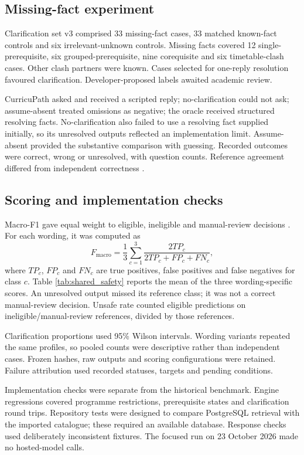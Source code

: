\subsection{Missing-fact experiment}
Clarification set v3 comprised 33 missing-fact cases, 33 matched known-fact controls and six irrelevant-unknown controls. Missing facts covered 12 single-prerequisite, six grouped-prerequisite, nine corequisite and six timetable-clash cases. Other clash partners were known. Cases selected for one-reply resolution favoured clarification. Developer-proposed labels awaited academic review.

CurricuPath asked and received a scripted reply; no-clarification could not ask; assume-absent treated omissions as negative; the oracle received structured resolving facts. No-clarification also failed to use a resolving fact supplied initially, so its unresolved outputs reflected an implementation limit. Assume-absent provided the substantive comparison with guessing. Recorded outcomes were correct, wrong or unresolved, with question counts. Reference agreement differed from independent correctness \cite{grras}.

\subsection{Scoring and implementation checks}
Macro-F1 gave equal weight to eligible, ineligible and manual-review decisions \cite{sokolova}. For each wording, it was computed as
\begin{equation}
 F_{\mathrm{macro}}=\frac{1}{3}\sum_{c=1}^{3}
 \frac{2TP_c}{2TP_c+FP_c+FN_c},
\label{eq:f1}
\end{equation}
where $TP_c$, $FP_c$ and $FN_c$ are true positives, false positives and false negatives for class $c$. Table \ref{tab:shared_safety} reports the mean of the three wording-specific scores. An unresolved output missed its reference class; it was not a correct manual-review decision. Unsafe rate counted eligible predictions on ineligible/manual-review references, divided by those references.

Clarification proportions used 95\% Wilson intervals. Wording variants repeated the same profiles, so pooled counts were descriptive rather than independent cases. Frozen hashes, raw outputs and scoring configurations were retained. Failure attribution used recorded statuses, targets and pending conditions.

Implementation checks were separate from the historical benchmark. Engine regressions covered programme restrictions, prerequisite states and clarification round trips. Repository tests were designed to compare PostgreSQL retrieval with the imported catalogue; these required an available database. Response checks used deliberately inconsistent fixtures. The focused run on 23 October 2026 made no hosted-model calls.

